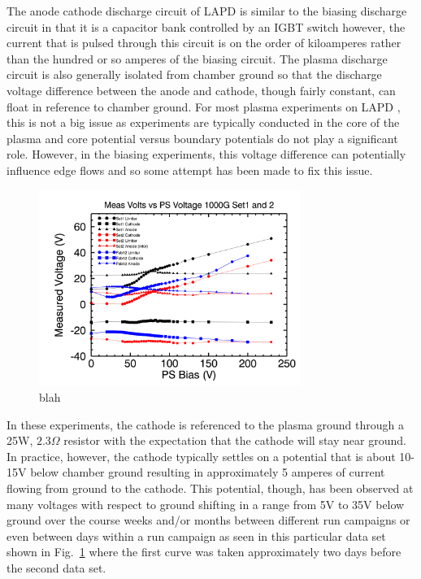 \documentclass[aip,pop,amsmath,amssymb,preprint,superscriptaddress]{revtex4-1} %
\begin{document}
The anode cathode discharge circuit of LAPD is similar to the biasing discharge circuit in that it is a capacitor bank controlled by an IGBT switch however, the current that is pulsed through this circuit is on the order of kiloamperes rather than the hundred or so amperes of the biasing circuit. The plasma discharge circuit is also generally isolated from chamber ground so that the discharge voltage difference between the anode and cathode, though fairly constant, can float in reference to chamber ground. For most plasma experiments on LAPD , this is  not a big issue as experiments are typically conducted in the core of the plasma and core potential versus boundary potentials do not play a significant role. However, in the biasing experiments, this voltage difference can potentially influence edge flows and so some attempt has been made to fix this issue.

\begin{figure}[!htbp]
\centerline{
\includegraphics[width=8.5cm]{an_cath}}
\caption{\label{fig:an_cath} blah}
\end{figure}

In these experiments, the cathode is referenced to the plasma ground through a 25W, $2.3\Omega$ resistor with the expectation that the cathode will stay near ground. In practice, however, the cathode typically settles on a potential that is about 10-15V below chamber ground resulting in approximately 5 amperes of current flowing from ground to the cathode. This potential, though, has been observed at many voltages with respect to ground shifting in a range from 5V to 35V below ground over the course weeks and/or months between different run campaigns or even between days within a run campaign as seen in this particular data set shown in Fig.~\ref{fig:an_cath} where the first curve was taken approximately two days before the second data set.
\end{document}
